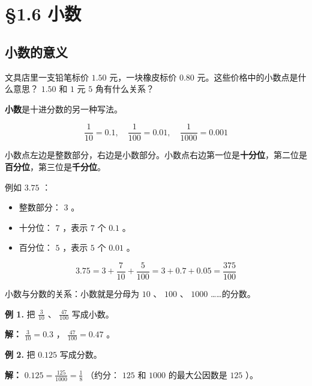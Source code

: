 \chapter{§1.6 小数}
\label{sec:1.6}





\section*{小数的意义}


\begin{explore}


文具店里一支铅笔标价 $1.50$ 元，一块橡皮标价 $0.80$ 元。这些价格中的小数点是什么意思？ $1.50$ 和 $1$ 元 $5$ 角有什么关系？

\end{explore}

\begin{understand}


\textbf{小数}是十进分数的另一种写法。

\[
\frac{1}{10} = 0.1, \quad \frac{1}{100} = 0.01, \quad \frac{1}{1000} = 0.001
\]


小数点左边是整数部分，右边是小数部分。小数点右边第一位是\textbf{十分位}，第二位是\textbf{百分位}，第三位是\textbf{千分位}。

例如 $3.75$ ：
\begin{itemize}
  \item 整数部分： $3$ 。
  \item 十分位： $7$ ，表示 $7$ 个 $0.1$ 。
  \item 百分位： $5$ ，表示 $5$ 个 $0.01$ 。
\end{itemize}


\[
3.75 = 3 + \frac{7}{10} + \frac{5}{100} = 3 + 0.7 + 0.05 = \frac{375}{100}
\]


小数与分数的关系：小数就是分母为 $10$ 、 $100$ 、 $1000$ ……的分数。

\end{understand}

\begin{workedexamples}


\textbf{例 1.} 把 $\frac{3}{10}$ 、 $\frac{47}{100}$ 写成小数。

\textbf{解：} $\frac{3}{10} = 0.3$ ， $\frac{47}{100} = 0.47$ 。

\textbf{例 2.} 把 $0.125$ 写成分数。

\textbf{解：} $0.125 = \frac{125}{1000} = \frac{1}{8}$ （约分： $125$ 和 $1000$ 的最大公因数是 $125$ ）。

\end{workedexamples}

